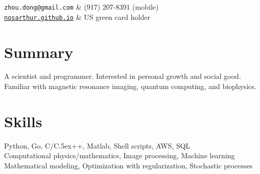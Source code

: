 \documentclass[centered,11pt,overlapped]{res}
\def\Cplusplus{{\rm C\raise.5ex\hbox{\small ++}}}
\begin{document}


\begin{resume}

\begin{ncolumn}{2}
   {\tt zhou.dong@gmail.com} &  (917) 207-8391 (mobile) \\
   {\tt \href{https://nosarthur.github.io}{nosarthur.github.io}} &  US green card holder
\end{ncolumn}


\section{\sc Summary}
A scientist and programmer.
Interested in personal growth and social good.
Familiar with magnetic resonance imaging, quantum computing, and biophysics.


\section{\sc Skills}
Python, Go, C/\Cplusplus, Matlab, Shell scripts, AWS, SQL\\
Computational physics/mathematics, Image processing, Machine learning\\
Mathematical modeling, Optimization with regularization, Stochastic processes
\end{resume}
\end{document}
